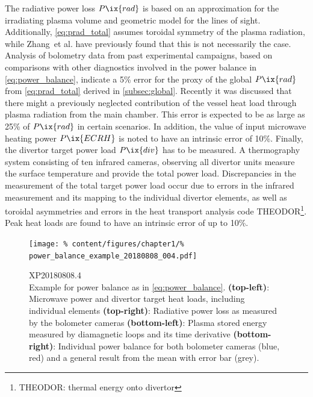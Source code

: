             The radiative power loss $P\ix{rad}$ is based on an approximation for the irradiating plasma volume and geometric model for the lines of sight. Additionally, \cref{eq:prad_total} assumes toroidal symmetry of the plasma radiation, while Zhang~et al. have previously found that this is not necessarily the case. Analysis of bolometry data from past experimental campaigns, based on comparisons with other diagnostics involved in the power balance in \cref{eq:power_balance}, indicate a 5\% error for the proxy of the global $P\ix{rad}$ from \cref{eq:prad_total} derived in \cref{subsec:global}. Recently it was discussed that there might a previously neglected contribution of the vessel heat load through plasma radiation from the main chamber. This error is expected to be as large as 25\% of $P\ix{rad}$ in certain scenarios. In addition, the value of input microwave heating power $P\ix{ECRH}$ is noted to have an intrinsic error of 10\%\cite{Marsen2016}. Finally, the divertor target power load $P\ix{div}$ has to be measured. A thermography system consisting of ten infrared cameras, observing all divertor units measure the surface temperature and provide the total power load\cite{Gao2019}. Discrepancies in the measurement of the total target power load occur due to errors in the infrared measurement and its mapping to the individual divertor elements, as well as toroidal asymmetries and errors in the heat transport analysis code THEODOR\footnote[1]{THEODOR: thermal energy onto divertor}. Peak heat loads are found to have an intrinsic error of up to 10\%\cite{Gao2019}.\\%
%
            \begin{figure}[t]%
                \centering%
                \texttt{[image: \%
                    content/figures/chapter1/\%
                    power\_balance\_example\_20180808\_004.pdf]}%
                \caption{%
                    XP20180808.4\\%
                    Example for power balance as in \cref{eq:power_balance}. \textbf{(top-left)}: Microwave power and divertor target heat loads, including individual elements \textbf{(top-right)}: Radiative power loss as measured by the bolometer cameras \textbf{(bottom-left)}: Plasma stored energy measured by diamagnetic loops and its time derivative \textbf{(bottom-right)}: Individual power balance for both bolometer cameras (blue, red) and a general result from the mean with error bar (grey).}\label{fig:powerbal_0808.004}%
            \end{figure}%
%
